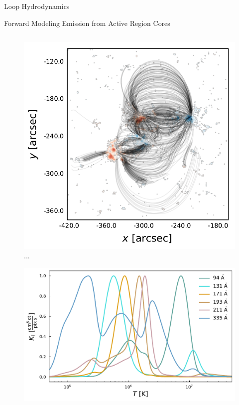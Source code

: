 \documentclass[final]{beamer}
\begin{document}
\begin{frame}
\begin{columns}[T]
\begin{column}{0.49\linewidth}
\begin{block}{Loop Hydrodynamics}
\begin{itemize}
    \end{itemize}
    \end{block}
    \begin{block}{Forward Modeling Emission from Active Region Cores}
    \begin{columns}[T]
        \begin{column}{0.49\columnwidth}
            \begin{figure}
                \includegraphics[width=\columnwidth]{figures/hmi_map_with_strands.pdf}
                \caption{...}
                \label{fig:hmi_map}
            \end{figure}
            \begin{figure}
                \includegraphics[width=\columnwidth]{figures/aia_response_functions.pdf}

\end{figure}
\end{column}
\end{columns}
\end{block}
\end{column}
\end{columns}
\end{frame}
\end{document}

